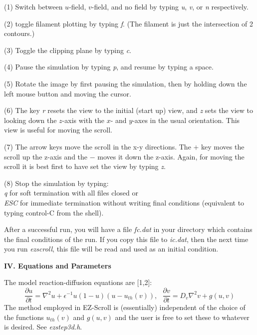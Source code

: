 \begin{list}{dummy}
{\partopsep=-10pt\parsep=-10pt\itemsep=12pt}
\item[(1)] Switch between $u$-field, $v$-field, and no field by typing
{\em u}, {\em v}, or {\em n} respectively.

\item[(2)] toggle filament plotting by typing {\em f}.  (The filament
is just the intersection of 2 contours.)

\item[(3)] Toggle the clipping plane by typing {\em c}.

\item[(4)] Pause the simulation by typing {\em p}, and resume by
typing a space.

\item[(5)] Rotate the image by first pausing the simulation, then by
holding down the left mouse button and moving the cursor.

\item[(6)] The key {\em r} resets the view to the initial (start up)
view, and {\em z} sets the view to looking down the $z$-axis with the
$x$- and $y$-axes in the usual orientation.  This view is useful for
moving the scroll.

\item[(7)] The arrow keys move the scroll in the x-y directions. The
$+$ key moves the scroll up the z-axis and the $-$ moves it
down the z-axis.  Again, for moving the scroll it is best first to
have set the view by typing {\em z}.

\item[(8)] Stop the simulation by typing: \\
{\em q} for soft termination with all files closed or  \\
{\em ESC} for immediate termination without writing final
conditions (equivalent to typing control-C from the shell). 

\end{list}

After a successful run, you will have a file {\em fc.dat} in your
directory which contains the final conditions of the run. If you copy
this file to {\em ic.dat}, then the next time you run {\em ezscroll},
this file will be read and used as an initial condition.

{\bf IV. Equations and Parameters} 

The model reaction-diffusion equations are [1,2]:
$$
\frac{\partial u }{ \partial t} = \nabla^2 u + 
	\epsilon^{-1} u(1-u)(u-u_{th}(v)), ~~~
\frac{\partial v }{ \partial t} = D_v \nabla^2 v + g(u,v)
$$
The method employed in EZ-Scroll is (essentially) independent of the
choice of the functions $u_{th}(v)$ and $g(u,v)$ and the user is free
to set these to whatever is desired.  See {\em ezstep3d.h}.

